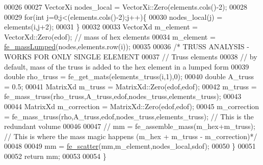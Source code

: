 \begin{DoxyCode}
00026 
00027     VectorXi nodes\_local = VectorXi::Zero(elements.cols()-2);
00028 
00029         \textcolor{keywordflow}{for}(\textcolor{keywordtype}{int} j=0;j<(elements.cols()-2);j++)\{
00030             nodes\_local(j) = elements(i,j+2);
00031         \}
00032 
00033         VectorXd m\_element = VectorXd::Zero(edof); \textcolor{comment}{// mass of hex elements}
00034         m\_element = \hyperlink{functions_8h_aa34a87447bf9fa851463ce99101a7054}{fe\_massLumped}(nodes,elements.row(i));
00035 
00036         \textcolor{comment}{/* TRUSS ANALYSIS - WORKS FOR ONLY SINGLE ELEMENT}
00037 \textcolor{comment}{        // Truss elements}
00038 \textcolor{comment}{        // by default, mass of the truss is added to the hex element in a lumped form}
00039 \textcolor{comment}{        double rho\_truss = fe\_get\_mats(elements\_truss(i,1),0);}
00040 \textcolor{comment}{        double A\_truss = 0.5;}
00041 \textcolor{comment}{        MatrixXd m\_truss = MatrixXd::Zero(edof,edof);}
00042 \textcolor{comment}{        m\_truss = fe\_mass\_truss(rho\_truss,A\_truss,edof,nodes\_truss,elements\_truss);}
00043 \textcolor{comment}{}
00044 \textcolor{comment}{        MatrixXd m\_correction = MatrixXd::Zero(edof,edof);}
00045 \textcolor{comment}{        m\_correction = fe\_mass\_truss(rho,A\_truss,edof,nodes\_truss,elements\_truss); // This is the redundant
       volume}
00046 \textcolor{comment}{}
00047 \textcolor{comment}{        // mm = fe\_assemble\_mass(m\_hex+m\_truss); // This is where the mass magic happens (m\_hex + m\_truss -
       m\_correction)*/}
00048 
00049     mm = \hyperlink{functions_8h_a6b8344e12f9005795f93f60ddda26c5c}{fe\_scatter}(mm,m\_element,nodes\_local,sdof);
00050   \}
00051 
00052   \textcolor{keywordflow}{return} mm;
00053 
00054 \}
\end{DoxyCode}
